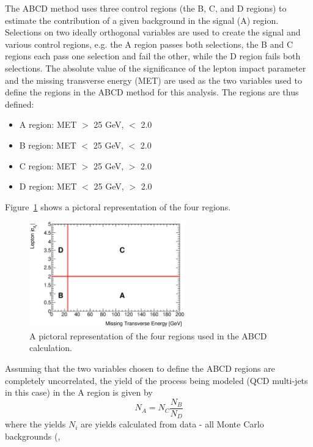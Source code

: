 The ABCD method uses three control regions (the B, C, and D regions) to estimate
the contribution of a given background in the signal (A) region. Selections on two ideally
orthogonal variables are used to create the signal and various control regions, e.g. 
the A region passes both selections, the B and C regions each pass one selection and fail the other, 
while the D region fails both selections. The absolute value of the significance of the lepton 
impact parameter and the missing transverse energy (MET) are used as the two variables 
used to define the regions in the ABCD method for this analysis. 
The regions are thus defined:
\begin{itemize}
\item A region: MET $>$ 25 GeV, \dsig $<$ 2.0
\item B region: MET $<$ 25 GeV, \dsig $<$ 2.0
\item C region: MET $>$ 25 GeV, \dsig $>$ 2.0
\item D region: MET $<$ 25 GeV, \dsig $>$ 2.0
\end{itemize}
Figure~\ref{fig:abcdCartoon} shows a pictoral representation of the four regions.\newline
\newpage
\begin{figure}[h!]
\begin{center}
\includegraphics[width=0.6\textwidth]{figures/multijet/abcdExample_met_vs_d0sigBL20}
\end{center}
\caption{A pictoral representation of the four regions used in the
  ABCD calculation.} \label{fig:abcdCartoon}
\end{figure}
Assuming that the two variables chosen to define the ABCD regions are completely uncorrelated, the 
yield of the process being modeled (QCD multi-jets in this case) in the A region is given by
\begin{equation}
N_{A} = N_C \frac{N_B}{N_D}
\label{eq:simpleABCD}
\end{equation}
where the yields $N_i$ are yields calculated from data - all Monte Carlo backgrounds (\ttbar, 
